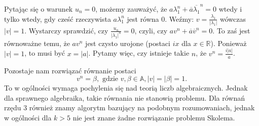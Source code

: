 \documentclass[leqno,10pt]{article}
\def\A{\mathbb{A}}
\begin{document}
Pytając się o warunek $u_n = 0$, możemy zauważyć, że $a \lambda_1^{n} + \overline{a} \overline{\lambda_1}^{n} = 0 $ wtedy i tylko wtedy, gdy cześć rzeczywista $a {\lambda_1^{n}}$ jest równa $0$. 
Weźmy: $v = \frac{\lambda_1}{|\lambda_1|} $ wówczas $|v| = 1$.
Wystarczy sprawdzić, czy $\frac{u_n}{|\lambda_1|^n} = 0$, czyli, czy $a v^{n} + \overline{a} \overline{v} ^{n} = 0$.
To zaś jest równoważne temu, że $a v^{n}$ jest czysto urojone (postaci $ix$ dla $x \in \mathbb{R}$). Ponieważ $|v| = 1$, to musi być $x = |a|$. Pytamy więc, czy istnieje takie $n$, że $v^{n} = \frac{i |a|}{a}$.

Pozostaje nam rozwiązać równanie postaci
\begin{equation*}
    v^{n} = \beta, \text{ gdzie } v, \beta \in \A, |v| = |\beta| = 1.
\end{equation*}
To w ogólności wymaga pochylenia się nad teorią liczb algebraicznych. Jednak dla sprawnego algebraika, takie równania nie stanowią problemu. Dla równań rzędu $3$ również znamy algorytm bazujący na podobnym rozumowaniach, jednak w ogólności dla $k>5$ nie jest znane żadne rozwiązanie problemu Skolema. 






\end{document}

